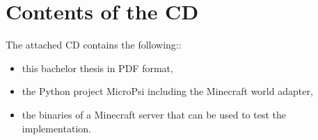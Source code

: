 \documentclass{thesisPST}
\begin{document}

\chapter{Contents of the CD}
The attached CD contains the following::
\begin{itemize}
	\item this bachelor thesis in PDF format,
	\item the Python project MicroPsi including the Minecraft world adapter,
	\item the binaries of a Minecraft server that can be used to test the implementation.
\end{itemize}

\cleardoublepage
{}
{} %

\end{document}
